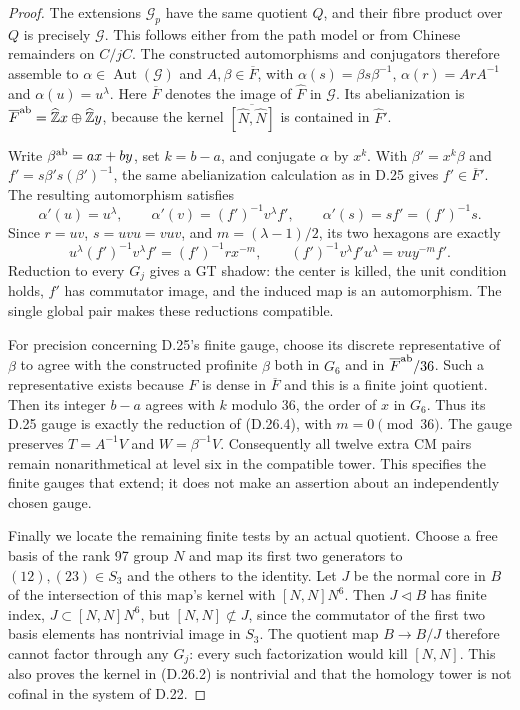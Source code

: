 \begin{proof}
The extensions $\mathcal G_p$ have the same quotient $Q$,
and their fibre product over $Q$ is precisely $\mathcal G$.
This follows either from the path model or from Chinese
remainders on $C/jC$. The constructed automorphisms and
conjugators therefore assemble to $\alpha\in
\operatorname{Aut}(\mathcal G)$ and $A,\beta\in\overline F$,
with $\alpha(s)=\beta s\beta^{-1}$,
$\alpha(r)=ArA^{-1}$ and $\alpha(u)=u^\lambda$.
Here $\overline F$ denotes the image of $\widehat F$ in
$\mathcal G$. Its abelianization is
$\overline F^{\rm ab}=\widehat{\mathbb Z}x\oplus
\widehat{\mathbb Z}y$, because the kernel
$\overline{[\widehat N,\widehat N]}$ is contained in
$\widehat F'$.

Write $\beta^{\rm ab}=ax+by$, set $k=b-a$, and conjugate
$\alpha$ by $x^k$. With $\beta'=x^k\beta$ and
$f'=s\beta's(\beta')^{-1}$, the same abelianization
calculation as in D.25 gives $f'\in\overline F'$.
The resulting automorphism satisfies
\[
 \alpha'(u)=u^\lambda,\qquad
 \alpha'(v)=(f')^{-1}v^\lambda f',\qquad
 \alpha'(s)=sf'=(f')^{-1}s.                             \tag{D.26.4}
\]
Since $r=uv$, $s=uvu=vuv$, and $m=(\lambda-1)/2$, its
two hexagons are exactly
\[
 u^\lambda(f')^{-1}v^\lambda f'=(f')^{-1}r x^{-m},\qquad
 (f')^{-1}v^\lambda f'u^\lambda=vu y^{-m}f'.             \tag{D.26.5}
\]
Reduction to every $G_j$ gives a GT shadow: the center is
killed, the unit condition holds, $f'$ has commutator image,
and the induced map is an automorphism. The single global
pair makes these reductions compatible.

For precision concerning D.25's finite gauge, choose its
discrete representative of $\beta$ to agree with the
constructed profinite $\beta$ both in $G_6$ and in
$\overline F^{\rm ab}/36$. Such a representative exists
because $F$ is dense in $\overline F$ and this is a finite
joint quotient. Then its integer $b-a$ agrees with $k$
modulo 36, the order of $x$ in $G_6$. Thus its D.25 gauge
is exactly the reduction of (D.26.4), with $m=0\pmod{36}$.
The gauge preserves $T=A^{-1}V$ and $W=\beta^{-1}V$.
Consequently all twelve extra CM pairs remain
nonarithmetical at level six in the compatible tower.
This specifies the finite gauges that extend; it does not
make an assertion about an independently chosen gauge.

Finally we locate the remaining finite tests by an actual
quotient. Choose a free basis of the rank 97 group $N$ and
map its first two generators to $(12),(23)\in S_3$ and
the others to the identity. Let $J$ be the normal core in
$B$ of the intersection of this map's kernel with
$[N,N]N^6$. Then $J\triangleleft B$ has finite index,
$J\subset[N,N]N^6$, but $[N,N]\not\subset J$, since
the commutator of the first two basis elements has nontrivial
image in $S_3$. The quotient map $B\to B/J$ therefore
cannot factor through any $G_j$: every such factorization
would kill $[N,N]$. This also proves the kernel in
(D.26.2) is nontrivial and that the homology tower is not
cofinal in the system of D.22.


\end{proof}
